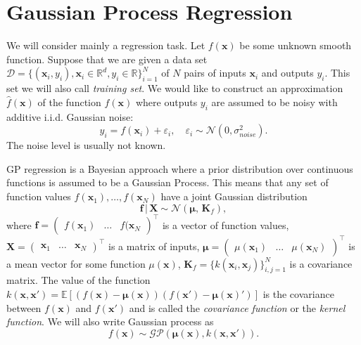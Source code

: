 
\section{Gaussian Process Regression}
\label{sec:intro}

We will consider mainly a regression task.
Let $f(\mathbf{x})$ be some unknown smooth function.
Suppose that we are given a data set
$\mathcal{D} = \{(\mathbf{x}_i, y_i), \mathbf{x}_i \in \mathbb{R}^d, y_i \in
\mathbb{R}\}_{i = 1}^N$
of $N$ pairs of inputs $\mathbf{x}_i$ and outputs $y_i$.
This set we will also call {\em training set}.
We would like to construct an approximation $\hat{f}(\mathbf{x})$
of the function $f(\mathbf{x})$
where outputs $y_i$ are assumed to be noisy with additive i.i.d. Gaussian noise:
\begin{equation}
    \label{eq:model}
      y_i = f(\mathbf{x}_i) + \varepsilon_i, \quad \varepsilon_i \sim \mathcal{N}(0, \sigma_{noise}^2).
\end{equation}
The noise level is usually not known.


GP regression is a Bayesian approach where a prior distribution over continuous functions
is assumed to be a Gaussian Process.
This means that any set of function values $f(\mathbf{x}_1), \ldots, f(\mathbf{x}_N)$
have a joint Gaussian distribution \citep{rasmussen2006gaussian}
\begin{equation}
  \label{eq:regression_problem}
  \mathbf{f} \, | \, \mathbf{X} \sim \mathcal{N}(\boldsymbol{\mu}, \, \mathbf{K}_f),
\end{equation}
where $\mathbf{f} = \begin{pmatrix}f(\mathbf{x}_1) & \ldots & f(\mathbf{x}_N\end{pmatrix}^\top$
is a vector of function values,
$\mathbf{X} = \begin{pmatrix}\mathbf{x}_1 & \ldots & \mathbf{x}_N\end{pmatrix}^\top$ is a matrix of inputs,
$\boldsymbol{\mu} =
\begin{pmatrix}\mu(\mathbf{x}_1) & \ldots & \mu(\mathbf{x}_N)\end{pmatrix}^\top$
is a mean vector for some function $\mu(\mathbf{x})$,
$\mathbf{K}_f = \{ k(\mathbf{x}_i, \mathbf{x}_j) \}_{i, j = 1}^N$ is a covariance matrix.
The value of the function $k(\mathbf{x, x}') = \mathbb{E}\left [
  (f(\mathbf{x}) - {\bm \mu}(\mathbf{x}))(f(\mathbf{x}') - {\bm \mu}(\mathbf{x})')
\right ]$ is the covariance between $f(\mathbf{x})$
and $f(\mathbf{x}')$ and is called the {\em covariance function} or the {\em kernel function}.
We will also write Gaussian process as
\[
  f(\mathbf{x}) \sim \mathcal{GP}({\bm \mu}(\mathbf{x}), k(\mathbf{x, x}')).
\]

